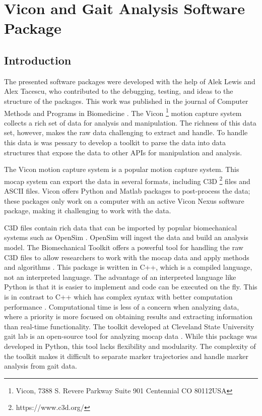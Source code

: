 \chapter{Vicon and Gait Analysis Software Package}
\label{chap:software}
\section{Introduction}

The presented software packages were developed with the help of Alek Lewis and Alex Tacescu, who contributed to the debugging, testing, and ideas to the structure of the packages. This work was published in the journal of Computer Methods and Programs in Biomedicine \cite{goldfarb2021open}. The Vicon \footnote{Vicon, 7388 S. Revere Parkway Suite 901 Centennial CO 80112USA} motion capture system collects a rich set of data for analysis and manipulation. The richness of this data set, however, makes the raw data challenging to extract and handle. To handle this data is was pessary to develop a toolkit to parse the data into data structures that expose the data to other APIs for manipulation and analysis. 

The Vicon motion capture system is a popular motion capture system. This mocap system can export the data in several formats, including C3D \footnote{https://www.c3d.org/}  files and ASCII files. Vicon offers Python and Matlab packages to post-process the data; these packages only work on a computer with an active Vicon Nexus software package, making it challenging to work with the data. 

C3D files contain rich data that can be imported by popular biomechanical systems such as OpenSim \cite{seth2018opensim}. OpenSim will ingest the data and build an analysis model. The Biomechanical Toolkit offers a powerful tool for handling the raw C3D files to allow researchers to work with the mocap data and apply methods and algorithms \cite{barre2014biomechanical}. This package is written in C++, which is a compiled language, not an interpreted language. The advantage of an interpreted language like Python is that it is easier to implement and code can be executed on the fly. This is in contrast to C++ which has complex syntax with better computation performance \cite{varisteas2018distributed} \cite{bargiacchi2020ai}. Computational time is less of a concern when analyzing data, where a priority is more focused on obtaining results and extracting information than real-time functionality. The toolkit developed at Cleveland State University gait lab is an open-source tool for analyzing mocap data  \cite{DTK2014} \cite{GATK2014}. While this package was developed in Python, this tool lacks flexibility and modularity. The complexity of the toolkit makes it difficult to separate marker trajectories and handle marker analysis from gait data.   

